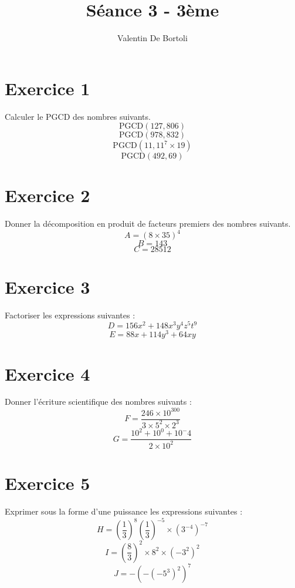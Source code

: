 \documentclass[10pt,a4paper]{article}
\title{Séance 3 - 3ème}
\author{Valentin De Bortoli}
\begin{document}
\maketitle
\section{Exercice 1}
Calculer le PGCD des nombres suivants.
\begin{equation}
\text{PGCD}(127,806)
\end{equation}
\begin{equation}
\text{PGCD}(978,832)
\end{equation}
\begin{equation}
\text{PGCD}(11,11^7 \times 19)
\end{equation}
\begin{equation}
\text{PGCD}(492,69)
\end{equation}
\section{Exercice 2}
Donner la décomposition en produit de facteurs premiers des nombres suivants.
\begin{equation}
A=(8 \times 35)^4
\end{equation}
\begin{equation}
B=143
\end{equation}
\begin{equation}
C=28512
\end{equation}
\section{Exercice 3}
Factoriser les expressions suivantes :
\begin{equation}
D=156x^2+148x^3y^4z^5t^9
\end{equation}
\begin{equation}
E=88x+114y^3+64xy
\end{equation}
\section{Exercice 4}
Donner l'écriture scientifique des nombres suivants :
\begin{equation}
F=\frac{246 \times 10^{300}}{3 \times 5^2 \times 2^3}
\end{equation}
\begin{equation}
G=\frac{10^2+10^0+10^-4}{2\times 10^2}
\end{equation}
\section{Exercice 5}
Exprimer sous la forme d'une puissance les expressions suivantes :
\begin{equation}
H=\left(\frac{1}{3}\right)^8\left(\frac{1}{3}\right)^{-5}\times (3^{-4})^{-7}
\end{equation}
\begin{equation}
I=\left(\frac{8}{3}\right)^2\times 8^2 \times (-3^2)^2
\end{equation}
\begin{equation}
J=-(-(-5^3)^2)^7
\end{equation}
\end{document}
